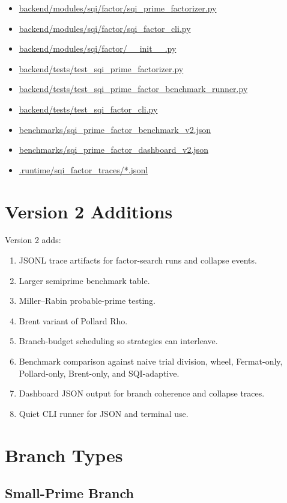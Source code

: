 \documentclass[11pt,a4paper]{article}
\begin{document}
\begin{itemize}
  \item \url{backend/modules/sqi/factor/sqi_prime_factorizer.py}
  \item \url{backend/modules/sqi/factor/sqi_factor_cli.py}
  \item \url{backend/modules/sqi/factor/__init__.py}
  \item \url{backend/tests/test_sqi_prime_factorizer.py}
  \item \url{backend/tests/test_sqi_prime_factor_benchmark_runner.py}
  \item \url{backend/tests/test_sqi_factor_cli.py}
  \item \url{benchmarks/sqi_prime_factor_benchmark_v2.json}
  \item \url{benchmarks/sqi_prime_factor_dashboard_v2.json}
  \item \url{.runtime/sqi_factor_traces/*.jsonl}
\end{itemize}

\section{Version 2 Additions}

Version 2 adds:

\begin{enumerate}
  \item JSONL trace artifacts for factor-search runs and collapse events.
  \item Larger semiprime benchmark table.
  \item Miller--Rabin probable-prime testing.
  \item Brent variant of Pollard Rho.
  \item Branch-budget scheduling so strategies can interleave.
  \item Benchmark comparison against naive trial division, wheel, Fermat-only,
  Pollard-only, Brent-only, and SQI-adaptive.
  \item Dashboard JSON output for branch coherence and collapse traces.
  \item Quiet CLI runner for JSON and terminal use.
\end{enumerate}

\section{Branch Types}

\subsection{Small-Prime Branch}
\end{document}
